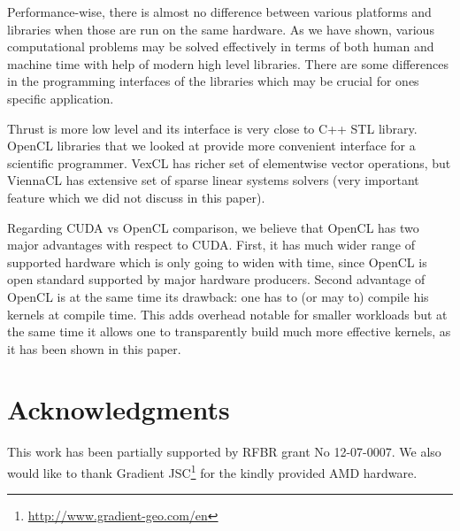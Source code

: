 \documentclass[1p]{elsarticle}
\begin{document}
Performance-wise, there is almost no difference between various platforms and
libraries when those are run on the same hardware. As we have shown, various
computational problems may be solved effectively in terms of both human and
machine time with help of modern high level libraries.  There are some
differences in the programming interfaces of the libraries which may be crucial
for ones specific application. 

Thrust is more low level and its interface is very close to C++ STL library.
OpenCL libraries that we looked at provide more convenient interface for a
scientific programmer. VexCL has richer set of elementwise vector operations,
but ViennaCL has extensive set of sparse linear systems solvers (very important
feature which we did not discuss in this paper).

Regarding CUDA vs OpenCL comparison, we believe that OpenCL has two major
advantages with respect to CUDA. First, it has much wider range of supported
hardware which is only going to widen with time, since OpenCL is open standard
supported by major hardware producers. Second advantage of OpenCL is at the
same time its drawback: one has to (or may to) compile his kernels at compile
time. This adds overhead notable for smaller workloads but at the same time it
allows one to transparently build much more effective kernels, as it has been
shown in this paper. 

\section{Acknowledgments}

This work has been partially supported by RFBR grant No 12-07-0007. We also
would like to thank Gradient
JSC\footnote{\href{http://www.gradient-geo.com/en}{http://www.gradient-geo.com/en}}
for the kindly provided AMD hardware.

\nocite{*}


\end{document}
